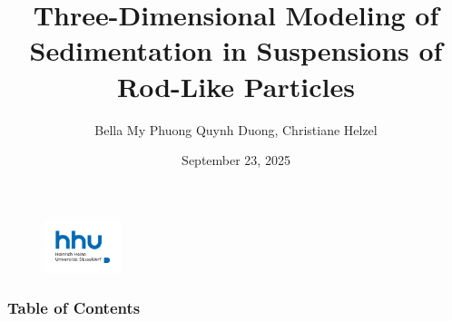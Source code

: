 \documentclass[lightblue, notheorems, xcolor=dvipsnames]{beamer}
\theoremstyle{definition}
\theoremstyle{plain}
\theoremstyle{example}
\begin{document}
  \author{Bella My Phuong Quynh Duong, Christiane Helzel}
  \date{September 23, 2025} %
  \title{Three-Dimensional Modeling of Sedimentation in
  	Suspensions of Rod-Like Particles}
  
  \begin{frame}
  	\titlepage
  	\begin{figure}[htpb]
  		\begin{center}
  			\includegraphics[width=0.2\textwidth]{logo.png}
  		\end{center}
  	\end{figure}
  \end{frame}
\begin{frame}
   \frametitle{Table of Contents}
\tableofcontents %
\end{frame}

\end{document}
